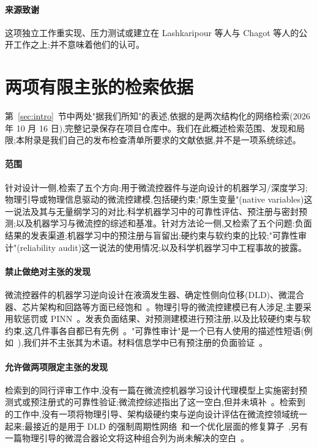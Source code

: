 \documentclass[11pt,a4paper]{ctexart}
\begin{document}
\paragraph{来源致谢} 这项独立工作重实现、压力测试或建立在 Lashkaripour 等人与 Chagot 等人的公开工作之上;并不意味着他们的认可。




\appendix

\section{两项有限主张的检索依据}
\label{app:search}

第~\ref{sec:intro}~节中两处"据我们所知"的表述,依据的是两次结构化的网络检索(2026 年 10 月 16 日),完整记录保存在项目仓库中。我们在此概述检索范围、发现和局限;本附录是我们自己的发布检查清单所要求的文献依据,并不是一项系统综述。

\paragraph{范围} 针对设计一侧,检索了五个方向:用于微流控器件与逆向设计的机器学习/深度学习;物理引导或物理信息驱动的微流控建模,包括硬约束;"原生变量"(native variables)这一说法及其与无量纲学习的对比;科学机器学习中的可靠性评估、预注册与密封预测;以及机器学习与微流控的综述和基准。针对方法论一侧,又检索了五个问题:负面结果的发表渠道;机器学习中的预注册与盲留出;硬约束与软约束的比较;"可靠性审计"(reliability audit)这一说法的使用情况;以及科学机器学习中工程事故的披露。

\paragraph{禁止做绝对主张的发现} 微流控器件的机器学习逆向设计在液滴发生器、确定性侧向位移(DLD)、微混合器、芯片架构和回路等方面已经饱和~\cite{lashkaripour2024,vatandoust2022,samari2025,li2026pathchip,mufg2026,ceyehao2026}。物理引导的微流控建模已有人涉足,主要采用软惩罚或 PINN~\cite{bpgnn2026,flexpinn2026}。发表负面结果、对预测建模进行预注册,以及比较硬约束与软约束,这几件事各自都已有先例~\cite{karl2024,hofman2023,naturecs2021,baty2023,prnet2026}。"可靠性审计"是一个已有人使用的描述性短语(例如~\cite{schulam2019}),我们并不主张其为术语。材料信息学中已有预注册的负面验证~\cite{vepa2026}。

\paragraph{允许做两项限定主张的发现} 检索到的同行评审工作中,没有一篇在微流控机器学习设计代理模型上实施密封预测式或预注册式的可靠性验证;微流控综述指出了这一空白,但并未填补~\cite{labchip2025review,das2025}。检索到的工作中,没有一项将物理引导、架构级硬约束与逆向设计评估在微流控领域统一起来;最接近的是用于 DLD 的强制周期性网络~\cite{lee2025}和一个优化层面的修复算子~\cite{micromixer2026},另有一篇物理引导的微混合器论文将这种组合列为尚未解决的空白~\cite{bpgnn2026}。
\end{document}
